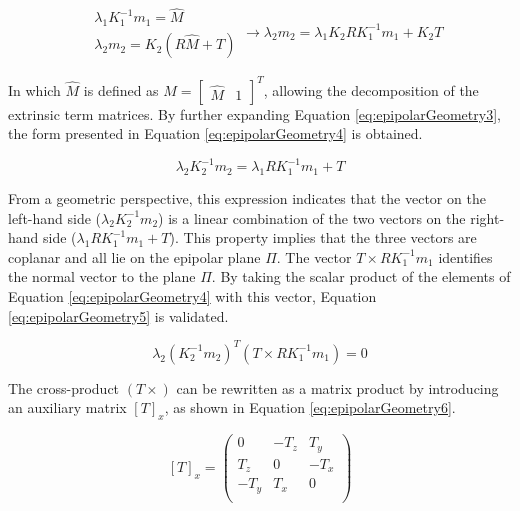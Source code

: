 \begin{equation}
    \label{eq:epipolarGeometry3}
    \begin{aligned}
    & \lambda_1 K_1^{-1} m_1 = \hat{M}   \\
    & \lambda_2 m_2 = K_2 (R \hat{M} + T)
    \end{aligned}
    \longrightarrow
    \lambda_2 m_2 = \lambda_1 K_2 R K_1^{-1} m_1 + K_2 T
\end{equation}

In which $\hat{M}$ is defined as $M = \begin{bmatrix} \hat{M} & 1 \end{bmatrix}^T$, allowing the decomposition of the extrinsic term matrices.  
By further expanding Equation \ref{eq:epipolarGeometry3}, the form presented in Equation \ref{eq:epipolarGeometry4} is obtained.  

\begin{equation}
    \label{eq:epipolarGeometry4}
    \lambda_2 K_2^{-1} m_2 = \lambda_1 R K_1^{-1} m_1 + T
\end{equation}

From a geometric perspective, this expression indicates that the vector on the left-hand side ($\lambda_2 K_2^{-1} m_2$) is a linear combination of the two vectors on the right-hand side ($\lambda_1 R K_1^{-1} m_1 + T$). This property implies that the three vectors are coplanar and all lie on the epipolar plane $\Pi$.  
The vector $T \times R K_1^{-1} m_1$ identifies the normal vector to the plane $\Pi$. By taking the scalar product of the elements of Equation \ref{eq:epipolarGeometry4} with this vector, Equation \ref{eq:epipolarGeometry5} is validated.

\begin{equation}
    \label{eq:epipolarGeometry5}
    \lambda_2 \left( K_2^{-1} m_2 \right)^T (T \times R K_1^{-1} m_1) = 0
\end{equation}

The cross-product $(T \times)$ can be rewritten as a matrix product by introducing an auxiliary matrix $[T]_x$, as shown in Equation \ref{eq:epipolarGeometry6}.

\begin{equation} 
  \label{eq:epipolarGeometry6}
    [T]_x = 
    \begin{pmatrix}
      0 & -T_z & T_y \\
      T_z & 0 & -T_x \\
      -T_y & T_x & 0 \\
      \end{pmatrix}
\end{equation}

